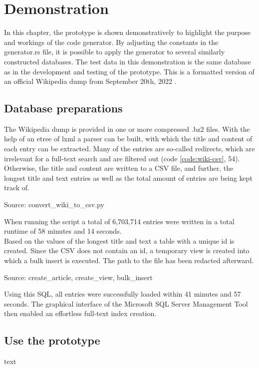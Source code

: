 \newpage
\section{Demonstration}
In this chapter, the prototype is shown demonstratively to highlight the purpose and workings of the code generator. By adjusting the constants in the generator.rs file, it is possible to apply the generator to several similarly constructed databases. The test data in this demonstration is the same database as in the development and testing of the prototype. This is a formatted version of an official Wikipedia dump from September 20th, 2022 \parencite[see][n.p.]{wikimedia_enwiki_nodate}.
\subsection{Database preparations}
The Wikipedia dump is provided in one or more compressed .bz2 files. With the help of an etree of lxml a parser can be built, with which the title and content of each entry can be extracted. Many of the entries are so-called redirects, which are irrelevant for a full-text search and are filtered out (code \ref{code:wiki-csv}, 54). Otherwise, the title and content are written to a \ac{CSV} file, and further, the longest title and text entries as well as the total amount of entries are being kept track of.
\begin{codeenv}
    \label{code:wiki-csv}
    
    \centerline{Source: convert\_wiki\_to\_csv.py}
\end{codeenv}
When running the script a total of 6,703,714 entries were written in a total runtime of 58 minutes and 14 seconds.\\
Based on the values of the longest title and text a table with a unique id is created. Since the \ac{CSV} does not contain an id, a temporary view is created into which a bulk insert is executed. The path to the file has been redacted afterward.
\begin{codeenv}
    \label{code:wiki-sql}
    
    
    
    \centerline{Source: create\_article, create\_view, bulk\_insert}
\end{codeenv}
Using this \ac{SQL}, all entries were successfully loaded within 41 minutes and 57 seconds. The graphical interface of the Microsoft SQL Server Management Tool then enabled an effortless full-text index creation.
\subsection{Use the prototype}
text